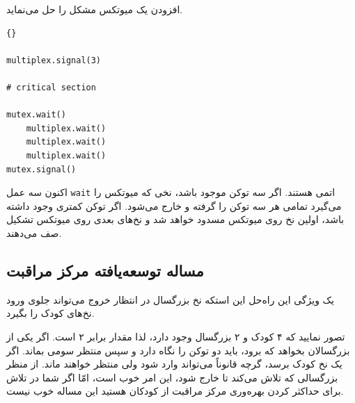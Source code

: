 \documentclass{book}
\begin{document}
    افزودن یک میوتکس مشکل را حل می‌نماید. 

\begin{latin}
\begin{lstlisting}[title=\rl{راه‌حل مرکز مراقبت از کودکان (بزرگسال)}]{}
     
multiplex.signal(3)

# critical section

mutex.wait()
    multiplex.wait()
    multiplex.wait()
    multiplex.wait()
mutex.signal()
\end{lstlisting}
\end{latin}

    اکنون سه عمل {\tt wait} اتمی هستند. اگر سه توکن موجود باشد، نخی که میوتکس را می‌گیرد تمامی هر سه توکن را گرفته و خارج می‌شود. 
    اگر  توکن کمتری وجود داشته باشد، اولین نخ روی میوتکس مسدود خواهد شد و نخ‌های بعدی روی میوتکس تشکیل صف می‌دهند. 

\subsection {مساله توسعه‌یافته مرکز مراقبت}

    یک ویژگی این راه‌حل این استکه نخ بزرگسال در انتظار خروج می‌تواند جلوی ورود نخ‌های کودک را بگیرد. 

    تصور نمایید که ۴ کودک و ۲ بزرگسال وجود دارد، لذا مقدار  برابر ۲ است. اگر یکی از بزرگسالان بخواهد که برود، باید دو توکن 
    را نگاه دارد و سپس منتظر سومی بماند. اگر یک نخ کودک برسد، گرچه قانوناً می‌تواند وارد شود ولی منتظر خواهند ماند. 
    از منظر بزرگسالی که تلاش می‌کند تا خارج شود، این امر خوب است، امّا اگر شما در تلاش برای حداکثر کردن بهره‌وری مرکز مراقبت از کودکان هستید 
    این مساله خوب نیست. 
\end{document}
